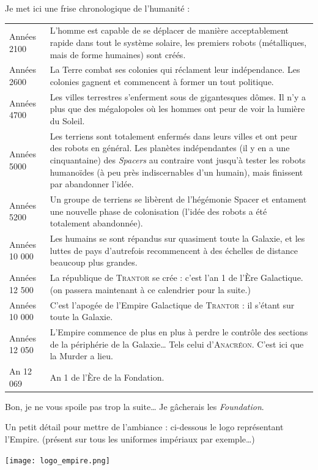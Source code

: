 \documentclass{article}
\begin{document}
Je met ici une frise chronologique de l’humanité : \\
\begin{tabular}{@{}p{\annee}p{\texte}@{}}
Années 2100 & L’homme est capable de se déplacer de manière acceptablement rapide dans tout le système solaire, les premiers robots (métalliques, mais de forme humaines) sont créés. \\
Années 2600 & La Terre combat ses colonies qui réclament leur indépendance. Les colonies gagnent et commencent à former un tout politique. \\
Années 4700 & Les villes terrestres s’enferment sous de gigantesques dômes. Il n’y a plus que des mégalopoles où les hommes ont peur de voir la lumière du Soleil. \\
Années 5000 & Les terriens sont totalement enfermés dans leurs villes et ont peur des robots en général. Les planètes indépendantes (il y en a une cinquantaine) des \textit{Spacers} au contraire vont jusqu’à tester les robots humanoïdes (à peu près indiscernables d’un humain), mais finissent par abandonner l’idée. \\
Années 5200 & Un groupe de terriens se libèrent de l’hégémonie Spacer et entament une nouvelle phase de colonisation (l’idée des robots a été totalement abandonnée). \\
Années 10 000 & Les humains se sont répandus sur quasiment toute la Galaxie, et les luttes de pays d’autrefois recommencent à des échelles de distance beaucoup plus grandes. \\
Années 12 500 & La république de \textsc{Trantor} se crée : c’est l’an 1 de l’Ère Galactique. (on passera maintenant à ce calendrier pour la suite.) \\
Années 10 000 & C’est l’apogée de l’Empire Galactique de \textsc{Trantor} : il s’étant sur toute la Galaxie. \\
Années 12 050 & L’Empire commence de plus en plus à perdre le contrôle des sections de la périphérie de la Galaxie… Tels celui d’\textsc{Anacréon}. C’est ici que la Murder a lieu. \\
An 12 069 & An 1 de l’Ère de la Fondation. \\
\end{tabular}
Bon, je ne vous spoile pas trop la suite… Je gâcherais les \textit{Foundation}.

Un petit détail pour mettre de l’ambiance :
ci-dessous le logo représentant l’Empire. (présent sur tous les uniformes impériaux par exemple…)

\begin{center}
	\texttt{[image: logo\_empire.png]}
\end{center}
\end{document}
